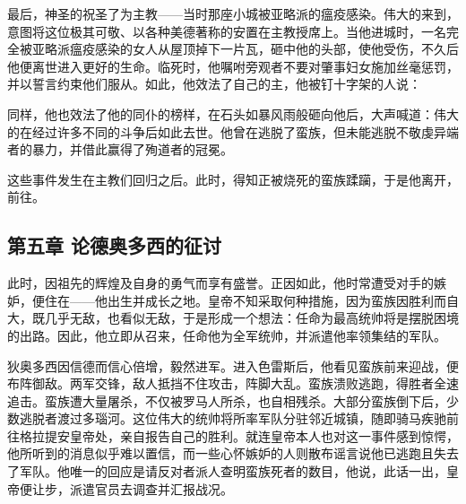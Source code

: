 最后，神圣的祝圣了为主教——当时那座小城被亚略派的瘟疫感染。伟大的来到，意图将这位极其可敬、以各种美德著称的安置在主教授席上。当他进城时，一名完全被亚略派瘟疫感染的女人从屋顶掉下一片瓦，砸中他的头部，使他受伤，不久后他便离世进入更好的生命。临死时，他嘱咐旁观者不要对肇事妇女施加丝毫惩罚，并以誓言约束他们服从。如此，他效法了自己的主，他被钉十字架的人说：\par

同样，他也效法了他的同仆的榜样，在石头如暴风雨般砸向他后，大声喊道：伟大的在经过许多不同的斗争后如此去世。他曾在逃脱了蛮族，但未能逃脱不敬虔异端者的暴力，并借此赢得了殉道者的冠冕。\par

这些事件发生在主教们回归之后。此时，得知正被烧死的蛮族蹂躏，于是他离开，前往。\par


\subsection{第五章 论德奥多西的征讨}

此时，因祖先的辉煌及自身的勇气而享有盛誉。正因如此，他时常遭受对手的嫉妒，便住在——他出生并成长之地。皇帝不知采取何种措施，因为蛮族因胜利而自大，既几乎无敌，也看似无敌，于是形成一个想法：任命为最高统帅将是摆脱困境的出路。因此，他立即从召来，任命他为全军统帅，并派遣他率领集结的军队。\par

狄奥多西因信德而信心倍增，毅然进军。进入色雷斯后，他看见蛮族前来迎战，便布阵御敌。两军交锋，敌人抵挡不住攻击，阵脚大乱。蛮族溃败逃跑，得胜者全速追击。蛮族遭大量屠杀，不仅被罗马人所杀，也自相残杀。大部分蛮族倒下后，少数逃脱者渡过多瑙河。这位伟大的统帅将所率军队分驻邻近城镇，随即骑马疾驰前往格拉提安皇帝处，亲自报告自己的胜利。就连皇帝本人也对这一事件感到惊愕，他所听到的消息似乎难以置信，而一些心怀嫉妒的人则散布谣言说他已逃跑且失去了军队。他唯一的回应是请反对者派人查明蛮族死者的数目，他说，此话一出，皇帝便让步，派遣官员去调查并汇报战况。\par

